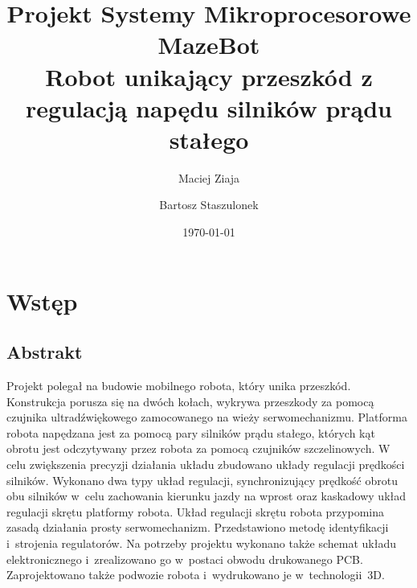 \documentclass[11pt]{article}
\author{Maciej Ziaja \and Bartosz Staszulonek}
\date{\today}
\begin{document}
\title{
  Projekt Systemy Mikroprocesorowe \\
  \large MazeBot \\
    Robot unikający przeszkód z regulacją napędu silników prądu stałego}

\maketitle

\newpage
{}
\tableofcontents
\newpage

\section{Wstęp}

\subsection{Abstrakt}
Projekt polegał na budowie mobilnego robota, który unika przeszkód.
Konstrukcja porusza się na dwóch kołach, wykrywa przeszkody za pomocą czujnika ultradźwiękowego zamocowanego na wieży serwomechanizmu.
Platforma robota napędzana jest za pomocą pary silników prądu stałego, których kąt obrotu jest odczytywany przez robota za pomocą czujników szczelinowych.
W celu zwiększenia precyzji działania układu zbudowano układy regulacji prędkości silników.
Wykonano dwa typy układ regulacji, synchronizujący prędkość obrotu obu silników w~celu zachowania kierunku jazdy na wprost oraz kaskadowy układ regulacji skrętu platformy robota.
Układ regulacji skrętu robota przypomina zasadą działania prosty serwomechanizm.
Przedstawiono metodę identyfikacji i~strojenia regulatorów.
Na potrzeby projektu wykonano także schemat układu elektronicznego i~zrealizowano go w~postaci obwodu drukowanego PCB.
Zaprojektowano także podwozie robota i~wydrukowano je w~technologii~3D.
\end{document}
